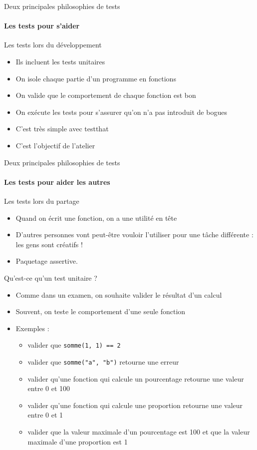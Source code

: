 \documentclass[11pt]{beamer}
\begin{document}
\begin{frame}{Deux principales philosophies de tests}
\framesubtitle{Les tests pour s'aider}
Les tests lors du développement
\begin{itemize}
\item Ils incluent les tests unitaires
\item On isole chaque partie d'un programme en fonctions
\item On valide que le comportement de chaque fonction est bon
\item On exécute les tests pour s'assurer qu'on n'a pas introduit de bogues
\item C'est très simple avec testthat
\item C'est l'objectif de l'atelier
\end{itemize}
\end{frame}

\begin{frame}{Deux principales philosophies de tests}
\framesubtitle{Les tests pour aider les autres}
Les tests lors du partage
\begin{itemize}
\item Quand on écrit une fonction, on a une utilité en tête
\item D'autres personnes vont peut-être vouloir l'utiliser pour une tâche différente : les gens sont créatifs !
\item Paquetage assertive.
\end{itemize}
\end{frame}

\begin{frame}{Qu'est-ce qu'un test unitaire ?}
\begin{itemize}
	\item Comme dans un examen, on souhaite valider le résultat d'un calcul
	\item Souvent, on teste le comportement d'une seule fonction
	\item Exemples : 
	\begin{itemize}
		\item valider que \texttt{somme(1, 1) == 2}
		\item valider que \texttt{somme("a", "b")} retourne une erreur
		\item valider qu'une fonction qui calcule un pourcentage retourne une valeur entre 0 et 100
		\item valider qu'une fonction qui calcule une proportion retourne une valeur entre 0 et 1
		\item valider que la valeur maximale d'un pourcentage est 100 et que la valeur maximale d'une proportion est 1
	\end{itemize}
\end{itemize}
\end{frame}
\end{document}
